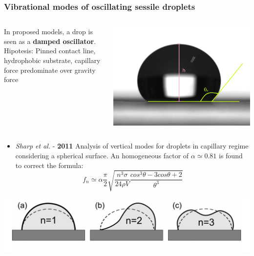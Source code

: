 \documentclass[xcolor=table]{beamer}
\begin{document}
\begin{frame}
\frametitle{Vibrational modes of oscillating sessile droplets}
\fontsize{10}{11.2} \selectfont
\begin{columns}
	\begin{column}{.6\textwidth}
		In proposed models, a drop is seen as a \textbf{damped oscillator}. \\
		Hipotesis: Pinned contact line, hydrophobic substrate, capillary force predominate over gravity force
\end{column}
\begin{column}{.25\textwidth}
	 \includegraphics[width=0.9\columnwidth]{40muL_3.png}
\end{column}
\end{columns}
		\begin{itemize}
			\item \textit{Sharp et al.} - \textbf{2011} Analysis of vertical modes for droplets in capillary regime considering a spherical surface. An homogeneous factor of  $\alpha\simeq0.81$ is found to correct the formula:
		\begin{equation}
		f_n\simeq\alpha\frac{\pi}{2}\sqrt{\frac{n^3\sigma}{24\rho V}\frac{cos^3\theta-3cos\theta+2}{\theta^3}}
		\end{equation}
			\end{itemize}
			
\centering
\includegraphics[width=.6\columnwidth]{modi.png}

\end{frame}
\end{document}
